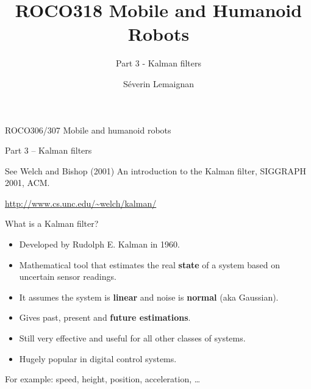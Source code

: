 \documentclass[compress]{beamer}
\title{ROCO318 \newline Mobile and Humanoid Robots}
\subtitle{Part 3 - Kalman filters}
\date{}
\author{Séverin Lemaignan}
\institute{Centre for Neural Systems and Robotics\\{\bf Plymouth University}}
\providecommand{\tightlist}{%
  \setlength{\itemsep}{0pt}\setlength{\parskip}{0pt}}
\begin{document}

\maketitle

\begin{frame}{ROCO306/307 Mobile and humanoid robots}

\begin{block}{Part 3 -- Kalman filters}

\end{block}

\begin{block}{}

\end{block}

\begin{block}{See Welch and Bishop (2001) An introduction to the Kalman
filter, SIGGRAPH 2001, ACM.}

\end{block}

\begin{block}{\url{http://www.cs.unc.edu/~welch/kalman/}}

\end{block}

\begin{block}{}

\end{block}

\end{frame}

\begin{frame}{What is a Kalman filter?}

\begin{itemize}
\tightlist
\item
  Developed by Rudolph E. Kalman in 1960.
\item
  Mathematical tool that estimates the real \textbf{state} of a system
  based on uncertain sensor readings.
\item
  It assumes the system is \textbf{linear} and noise is \textbf{normal}
  (aka Gaussian).
\item
  Gives past, present and \textbf{future estimations}.
\item
  Still very effective and useful for all other classes of systems.
\item
  Hugely popular in digital control systems.
\end{itemize}

For example: speed, height, position, acceleration, \ldots{}

\end{frame}
\end{document}

